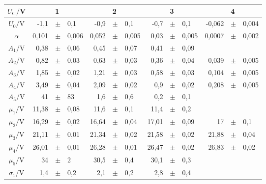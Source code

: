   \begin{table}[h]
    \centering
    \begin{tabular}{c | r p{0.05cm} l r p{0.05cm} l r p{0.05cm} l r p{0.05cm} l}
      \toprule
       $U_\mathrm{G}/$V & & 1 & & & 2 & & & 3 & & & 4 &\\  
      \midrule
      $U_0/$V &              -1,1         &$\pm$ & 0,1      &   -0,9        &$\pm$ & 0,1     & -0,7  & $\pm$ &  0,1  &  -0,062  & $\pm$  & 0,004 \\    
      $\alpha$ & 0,101         &$\pm$ & 0,006    &  0,052        &$\pm$ & 0,005    & 0,03  & $\pm$ & 0,005   &   0,0007 & $\pm$  & 0,002 \\
      $A_1$/V &              0,38         &$\pm$ & 0,06     &   0,45          &$\pm$ & 0,07    & 0,41  & $\pm$ &  0,09  &    &   &  \\ 
      $A_2$/V &              0,82         &$\pm$ & 0,03     &   0,63         &$\pm$ & 0,03    &  0,36 & $\pm$ & 0,04   &  0,039  & $\pm$  & 0,005 \\ 
      $A_3$/V &             1,85          &$\pm$ & 0,02     &   1,21          &$\pm$ & 0,03    & 0,58  & $\pm$ & 0,03   &  0,104  & $\pm$  & 0,005 \\ 
      $A_4$/V &              3,49          &$\pm$ & 0,04     &   2,09          &$\pm$ & 0,02    & 0,9  & $\pm$ &  0,02  &  0,208  & $\pm$  & 0,005 \\ 
      $A_5$/V &              41          &$\pm$ & 83       &   1,6          &$\pm$ & 0,6     & 0,2  & $\pm$ & 0,1   &    &  &  \\ 
      $\mu_1/$V &            11,38          &$\pm$ & 0,08     &   11,6            &$\pm$ & 0,1     & 11,4  & $\pm$ & 0,2   &    &   &  \\ 
      $\mu_2/$V &           16,29          &$\pm$ & 0,02     &  16,64          &$\pm$ & 0,04    &  17,01 & $\pm$ & 0,09   &  17  & $\pm$  & 0,1 \\ 
      $\mu_3/$V &            21,11           &$\pm$ & 0,01      &   21,34           &$\pm$ & 0,02     & 21,58  & $\pm$ & 0,02   &   21,88 & $\pm$  & 0,04 \\ 
      $\mu_4/$V &            26,01          &$\pm$ & 0,01    &   26,28          &$\pm$ & 0,01   & 26,47  & $\pm$ & 0,02   &  26,83  & $\pm$ & 0,02 \\ 
      $\mu_5/$V &            34          &$\pm$ & 2       &   30,5          &$\pm$ & 0,4     & 30,1  & $\pm$ &  0,3  &    &  &  \\ 
      $\sigma_1$/V &         1,4          &$\pm$ & 0,2      &   2,1          &$\pm$ & 0,2     & 2,8  & $\pm$ & 0,4   &    &   &  \\ 

\end{tabular}
\end{table}
